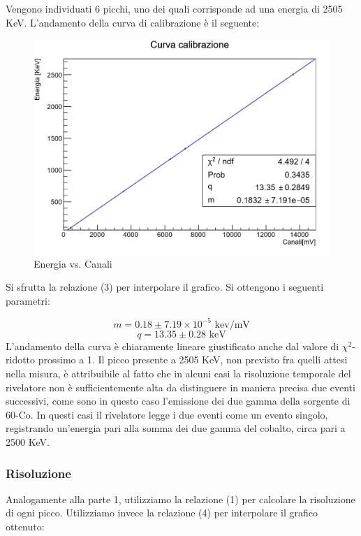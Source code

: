 \documentclass[a4paper,10pt]{article}
\newcommand*{\unit}[1]{\ensuremath{\mathrm{\,#1}}}
\begin{document}
\noindent Vengono individuati 6 picchi, uno dei quali corrisponde ad una energia di 2505 KeV. L'andamento della curva di calibrazione \`e il seguente:

\begin{figure}[H]
    \centering
    \includegraphics[scale=0.45]{grafici/rettacalibrazionemultigamma}
    \caption{Energia vs. Canali}
\end{figure}

\noindent Si sfrutta la relazione (3) per interpolare il grafico. Si ottengono i seguenti parametri:

$$
	m=0.18 \pm 7.19 \times 10^{-5}\, \unit{kev/mV}
$$
$$
	q=13.35 \pm 0.28\, \unit{keV}
$$
L'andamento della curva \`e chiaramente lineare giustificato anche dal valore di $\chi^2$-ridotto prossimo a 1. Il picco presente a 2505 KeV, non previsto fra quelli attesi nella misura, \`e attribuibile al fatto che in alcuni casi la risoluzione temporale del rivelatore non \`e sufficientemente alta da distinguere in maniera precisa due eventi successivi, come sono in questo caso l'emissione dei due gamma della sorgente di 60-Co. In questi casi il rivelatore legge i due eventi come un evento singolo, registrando un'energia pari alla somma dei due gamma del cobalto, circa pari a 2500 KeV.


\subsubsection{Risoluzione}
Analogamente alla parte 1, utilizziamo la relazione (1) per calcolare la risoluzione di ogni picco. Utilizziamo invece la relazione (4) per interpolare il grafico ottenuto:
\end{document}
